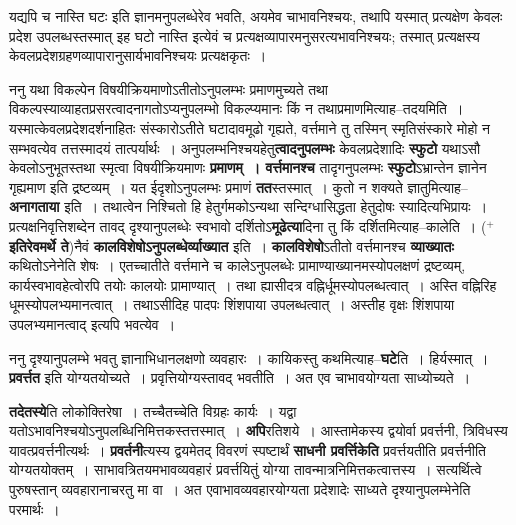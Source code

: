 \documentclass[article,12pt,a4paper]{memoir}
\newcommand{\add}[1]{($^{+}$#1)}
\begin{document}
	  \pstart यद्यपि च नास्ति घटः इति ज्ञानमनुपलब्धेरेव भवति, अयमेव चाभावनिश्चयः, तथापि यस्मात् प्रत्यक्षेण केवलः प्रदेश उपलब्धस्तस्मात् इह घटो नास्ति इत्येवं च प्रत्यक्षव्यापारमनुसरत्यभावनिश्चयः; तस्मात् प्रत्यक्षस्य केवलप्रदेशग्रहणव्यापारानुसार्यभावनिश्चयः प्रत्यक्षकृतः ।
	\pend
      
	  \endgroup
	

	  \pstart ननु यथा विकल्पेन विषयीक्रियमाणोऽतीतोऽनुपलम्भः प्रमाणमुच्यते तथा विकल्पस्याव्याहतप्रसरत्वादनागतोऽप्यनुपलम्भो विकल्प्यमानः किं न तथाप्रमाणमित्याह--तदयमिति । यस्मात्केवलप्रदेशदर्शनाहितः संस्कारोऽतीते घटादावमूढो गृह्यते, वर्त्तमाने तु तस्मिन् स्मृतिसंस्कारे मोहो न सम्भवत्येव तत्तस्मादयं तात्पर्यार्थः । अनुपलम्भनिश्चयहेतु\textbf{त्वादनुपलम्भः} केवलप्रदेशादिः \textbf{स्फुटो} यथाऽसौ केवलोऽनुभूतस्तथा स्मृत्वा विषयीक्रियमाणः \textbf{प्रमाणम् । वर्त्तमानश्च} तादृगनुपलम्भः \textbf{स्फुटो}ऽभ्रान्तेन ज्ञानेन गृह्यमाण इति द्रष्टव्यम् । यत ईदृशोऽनुपलम्भः प्रमाणं \textbf{तत}स्तस्मात् । कुतो न शक्यते ज्ञातुमित्याह--\textbf{अनागताया} इति । तथात्वेन निश्चितो हि हेतुर्गमकोऽन्यथा सन्दिग्धासिद्धता हेतुदोषः स्यादित्यभिप्रायः । प्रत्यक्षनिवृत्तिशब्देन तावद् दृश्यानुपलब्धेः स्वभावो दर्शितोऽ\textbf{मूढेत्या}दिना तु किं दर्शितमित्याह--कालेति । \add{\textbf{इतिरेवमर्थे ते}}नैवं \textbf{कालविशेषोऽनुपलब्धेर्व्याख्यात} इति । \textbf{कालविशेषो}ऽतीतो वर्त्तमानश्च \textbf{व्याख्यातः} कथितोऽनेनेति शेषः । एतच्चातीते वर्त्तमाने च कालेऽनुपलब्धेः प्रामाण्याख्यानमस्योपलक्षणं द्रष्टव्यम्, कार्यस्वभावहेत्वोरपि तयोः कालयोः प्रामाण्यात् । तथा ह्यासीदत्र वह्निर्धूमस्योपलब्धत्वात् । अस्ति वह्निरिह धूमस्योपलभ्यमानत्वात् । तथाऽसीदिह पादपः शिंशपाया उपलब्धत्वात् । अस्तीह वृक्षः शिंशपाया उपलभ्यमानत्वाद् इत्यपि भवत्येव ।
	\pend
      

	  \pstart ननु दृश्यानुपलम्भे भवतु ज्ञानाभिधानलक्षणो व्यवहारः । कायिकस्तु कथमित्याह--\textbf{घटे}ति । हिर्यस्मात् । \textbf{प्रवर्त्तत} इति योग्यतयोच्यते । प्रवृत्तियोग्यस्तावद् भवतीति । अत एव चाभावयोग्यता साध्योच्यते ।
	\pend
      

	  \pstart \textbf{तदेतस्ये}ति लोकोक्तिरेषा । तच्चैतच्चेति विग्रहः कार्यः । यद्वा यतोऽभावनिश्चयोऽनुपलब्धिनिमित्तकस्तत्तस्मात् । \textbf{अपि}रतिशये । आस्तामेकस्य द्वयोर्वा प्रवर्त्तनी, त्रिविधस्य यावत्प्रवर्त्तनीत्यर्थः । \textbf{प्रवर्तनी}त्यस्य द्वयमेतद् विवरणं स्पष्टार्थं \textbf{साधनी प्रवर्त्तिके}\leavevmode{}\textbf{ति} प्रवर्त्तयतीति प्रवर्त्तनीति योग्यतयोक्तम् । साभावत्रितयमभावव्यवहारं प्रवर्त्तयितुं योग्या तावन्मात्रनिमित्तकत्वात्तस्य । सत्यर्थित्वे पुरुषस्तान् व्यवहारानाचरतु मा वा । अत एवाभावव्यवहारयोग्यता प्रदेशादेः साध्यते दृश्यानुपलम्भेनेति परमार्थः ।
	\pend
	  \bigskip
	  \begingroup
	
\end{document}
